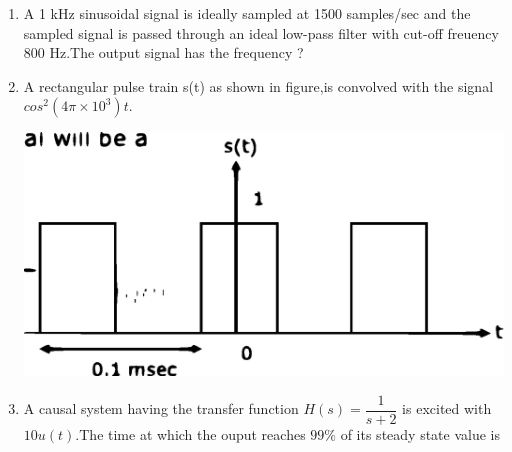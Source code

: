 \documentclass[journal,12pt,twocolumn]{IEEEtran}
\begin{document}
\begin{enumerate}[1.]
\begin{enumerate}[(A)]
\end{enumerate}


\item A 1 kHz sinusoidal signal is ideally sampled at 1500 samples/sec and the sampled signal is passed through an ideal low-pass filter with cut-off freuency 800 Hz.The output signal has the frequency ?



\begin{enumerate}[(A)]
\end{enumerate}

\item A rectangular pulse train s(t) as shown in figure,is convolved with the signal $cos^{2}(4\pi \times 10^{3})t$.

\includegraphics[scale=0.4]{fig3.eps}

\begin{enumerate}[(A)]
\end{enumerate}



\item A causal system having the transfer function $H(s)=\dfrac{1}{s+2}$ is excited with $10u(t)$.The time at which the ouput reaches $99\%$ of its steady state value is
\begin{enumerate}[(A)]
\begin{multicols}{2}
\setlength\itemsep{1em}


\end{multicols}
\end{enumerate}
\end{enumerate}
\end{document}

